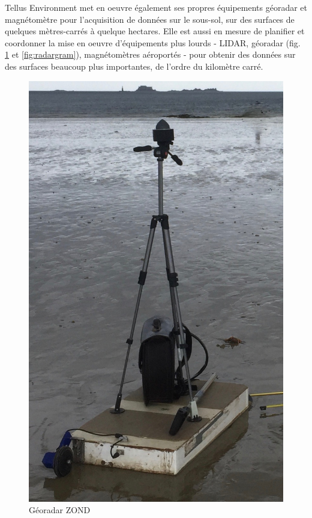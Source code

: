 \documentclass[12pt,a4paper]{report}
\begin{document}
	\para Tellus Environment met en oeuvre également ses propres équipements géoradar et magnétomètre pour l'acquisition de données sur le sous-sol, sur des surfaces de quelques mètres-carrés à quelque hectares. Elle est aussi en mesure de planifier et coordonner la mise en oeuvre d'équipements plus lourds - LIDAR, géoradar (fig. \ref{fig:georadar} et \ref{fig:radargram}), magnétomètres aéroportés - pour obtenir des données sur des surfaces beaucoup plus importantes, de l'ordre du kilomètre carré.
	
	\begin{figure}
		\centering
		
		\begin{minipage}{.5\textwidth}
			\centering
			\includegraphics[width=0.7\linewidth]{img/IMG_0332}
			\caption[Géoradar]{Géoradar ZOND}
			\label{fig:georadar}
		\end{minipage}%
		\begin{minipage}{.5\textwidth}
				\centering

\end{minipage}
\end{figure}
\end{document}

